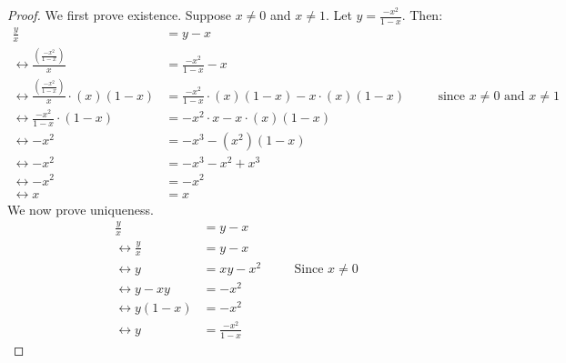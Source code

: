 \begin{proof}
    We first prove existence.
    Suppose $x \not = 0$ and $x \not = 1$.
    Let $y = \frac{-x^2}{1 - x}$.
    Then:
    \begin{align*}
        \frac{y}{x}                                    & = y - x                                                    &  &                                                 \\
        \leftrightarrow \frac{(\frac{-x^2}{1 - x})}{x} & = \frac{-x^2}{1 - x} - x                                   &  &                                                 \\
        \leftrightarrow \frac{(\frac{-x^2}{1 - x})}{x} \cdot (x)(1 - x)
                                                       & = \frac{-x^2}{1 - x} \cdot (x)(1 - x) - x \cdot (x)(1 - x) &  & \quad\text{since $x \not = 0$ and $x \not = 1$} \\
        \leftrightarrow \frac{-x^2}{1 - x} \cdot (1 - x)
                                                       & = -x^2 \cdot x - x \cdot (x)(1 - x)                        &  &                                                 \\
        \leftrightarrow -x^2                           & = -x^3 - (x^2)(1 - x)                                      &  &                                                 \\
        \leftrightarrow -x^2                           & = -x^3 - x^2 + x^3                                         &  &                                                 \\
        \leftrightarrow -x^2                           & = - x^2                                                    &  &                                                 \\
        \leftrightarrow x                              & = x                                                        &  & 
    \end{align*}
    We now prove uniqueness.
    \begin{align*}
        \frac{y}{x}                 & = y - x              &  &                                \\
        \leftrightarrow \frac{y}{x} & = y - x              &  &                                \\
        \leftrightarrow y           & = xy - x^2           &  & \quad\text{Since $x \not = 0$} \\
        \leftrightarrow y - xy      & = - x^2              &  &                                \\
        \leftrightarrow y(1 - x)    & = - x^2              &  &                                \\
        \leftrightarrow y           & = \frac{-x^2}{1 - x} &  & 
    \end{align*}
\end{proof}

